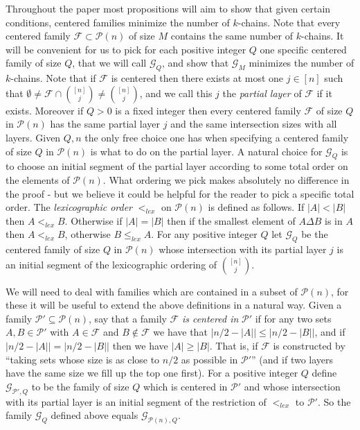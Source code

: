 \documentclass[12pt]{article}
\numberwithin{equation}{section}
\def\F{\mathcal{F}}
\def\G{\mathcal{G}}
\def\P{\mathcal{P}}
\begin{document}
Throughout the paper most propositions will aim to show that given certain conditions, centered families minimize the number of $k$-chains. Note that every centered family $\F\subset \P(n)$ of size $M$ contains the same number of $k$-chains. It will be convenient for us to pick for each positive integer $Q$ one specific centered family of size $Q$, that we will call $\G_Q$, and show that $\G_M$ minimizes the number of $k$-chains. 
Note that if $\F$ is centered then there exists at most one $j\in [n]$ such that $\emptyset\neq \F\cap\binom{[n]}{j}\neq \binom{[n]}{j}$, and we call this $j$ the \emph{partial layer} of $\F$ if it exists. Moreover if $Q>0$ is a fixed integer then every centered family $\F$ of size $Q$ in $\P(n)$ has the same partial layer $j$ and the same intersection sizes with all layers. Given $Q,n$ the only free choice one has when specifying a centered family of size $Q$ in $\P(n)$ is what to do on the partial layer. A natural choice for $\G_Q$ is to choose an initial segment of the partial layer according to some total order on the elements of $\P(n)$. What ordering we pick makes absolutely no difference in the proof - but we believe it could be helpful for the reader to pick a specific total order. The \emph{lexicographic order} $<_{lex}$ on $\P(n)$ is defined as follows. If $|A|<|B|$ then $A<_{lex} B$. Otherwise if $|A|=|B|$ then if the smallest element of $A\Delta B$ is in $A$ then $A<_{lex} B$, otherwise $B\leq_{lex} A$. 
For any positive integer $Q$ let $\G_Q$ be the centered family of size $Q$ in $\P(n)$ whose intersection with its partial layer $j$ is an initial segment of the lexicographic ordering of $\binom{[n]}{j}$.

We will need to deal with families which are contained in a subset of $\P(n)$, for these it will be useful to extend the above definitions in a natural way. Given a family $\P'\subseteq \P(n)$, say that a family $\F$ \emph{is centered in} $\P'$ if for any two sets $A,B\in \P'$ with $A\in \F$ and $B\notin \F$ we have that $|n/2-|A||\leq|n/2-|B||$, and if $|n/2-|A||=|n/2-|B||$ then we have $|A|\geq |B|$. That is, if $\F$ is constructed by ``taking sets whose size is as close to $n/2$ as possible in $\P'$'' (and if two layers have the same size we fill up the top one first). For a positive integer $Q$ define $\G_{\P',Q}$ to be the family of size $Q$ which is centered in $\P'$ and whose intersection with its partial layer is an initial segment of the restriction of $<_{lex}$ to $\P'$. So the family $\G_Q$ defined above equals $\G_{\P(n),Q}$.
\end{document}
